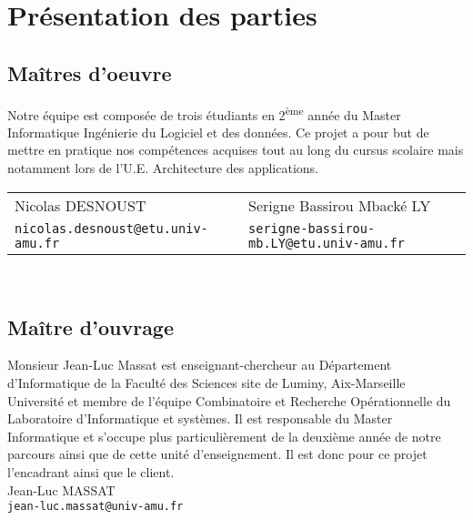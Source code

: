 \section{\textbf{Présentation des parties}}

\subsection{\textbf{Maîtres d'oeuvre}}
Notre équipe est composée de trois étudiants en 2\textsuperscript{ème} année du Master Informatique Ingénierie du Logiciel et des données. Ce projet a pour but de mettre en pratique nos compétences acquises tout au long du cursus scolaire mais notamment lors de l'U.E. Architecture des applications.

\indent\hspace{-0.5em}\begin{tabular}{l l}
	Nicolas DESNOUST & Serigne Bassirou Mbacké LY\\[-0.4cm]
	\texttt{nicolas.desnoust@etu.univ-amu.fr}&\texttt{serigne-bassirou-mb.LY@etu.univ-amu.fr}
\end{tabular}\\

\subsection{\textbf{Maître d'ouvrage}}
Monsieur Jean-Luc Massat est enseignant-chercheur au Département d'Informatique de la Faculté des Sciences site de Luminy, Aix-Marseille Université et membre de l'équipe Combinatoire et Recherche Opérationnelle du Laboratoire d'Informatique et systèmes. Il est responsable du Master Informatique et s'occupe plus particulièrement de la deuxième année de notre parcours ainsi que de cette unité d'enseignement. Il est donc pour ce projet l'encadrant ainsi que le client.
\\[0.7em]
\indent Jean-Luc MASSAT\\
\indent \texttt{jean-luc.massat@univ-amu.fr}